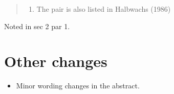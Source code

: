 \documentclass[12pt]{article}
\begin{document}
\begin{quote}
\begin{enumerate}
\def\labelenumi{\arabic{enumi}.}
\setcounter{enumi}{2}
\itemsep1pt\parskip0pt
\item
  The pair is also listed in Halbwachs (1986)
\end{enumerate}
\end{quote}
Noted in sec 2 par 1.

\section*{Other changes}
\label{sec:other}

\begin{itemize}
\item Minor wording changes in the abstract.
\end{itemize}

%

\end{document}
